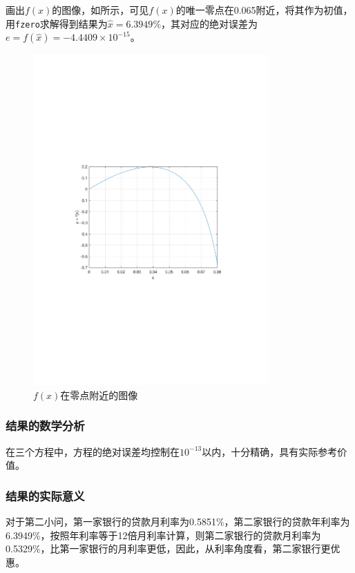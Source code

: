 \documentclass[12pt,a4paper]{article}
\begin{document}
画出$f(x)$的图像，如所示，可见$f(x)$的唯一零点在0.065附近，将其作为初值，用\texttt{fzero}求解得到结果为$\hat{x}=6.3949\%$，其对应的绝对误差为$e=f(\hat{x})=-4.4409\times 10^{-15}$。

\begin{figure}[t]
    \centering
    \includegraphics[width=0.8\textwidth,trim={3.09cm 9.295cm 3.09cm 9.295cm},clip]{fig/ex3_3_graph.pdf}
    \caption{$f(x)$在零点附近的图像}
    \label{fig:ex3_3_graph}
\end{figure}

\subsubsection{结果的数学分析}

在三个方程中，方程的绝对误差均控制在$10^{-13}$以内，十分精确，具有实际参考价值。

\subsubsection{结果的实际意义}

对于第二小问，第一家银行的贷款月利率为0.5851\%，第二家银行的贷款年利率为6.3949\%，按照年利率等于12倍月利率计算，则第二家银行的贷款月利率为0.5329\%，比第一家银行的月利率更低，因此，从利率角度看，第二家银行更优惠。
\end{document}
